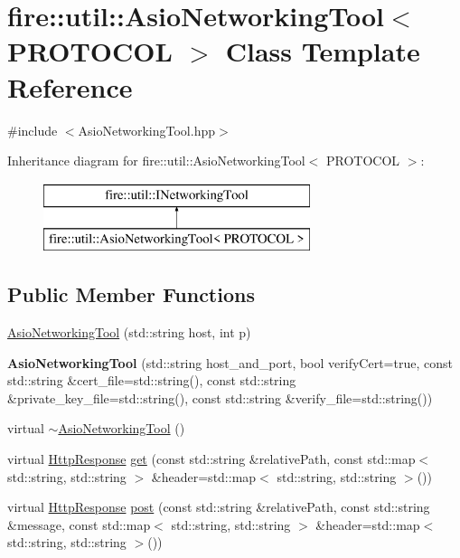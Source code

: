 \hypertarget{a00039}{}\section{fire\+:\+:util\+:\+:Asio\+Networking\+Tool$<$ P\+R\+O\+T\+O\+C\+OL $>$ Class Template Reference}
\label{a00039}


{\ttfamily \#include $<$Asio\+Networking\+Tool.\+hpp$>$}

Inheritance diagram for fire\+:\+:util\+:\+:Asio\+Networking\+Tool$<$ P\+R\+O\+T\+O\+C\+OL $>$\+:\begin{figure}[H]
\begin{center}
\leavevmode
\includegraphics[height=2.000000cm]{a00039}
\end{center}
\end{figure}
\subsection*{Public Member Functions}
\begin{DoxyCompactItemize}
\item 
\hyperlink{a00039_a5edd72ce9937e052a82e7564500b3861}{Asio\+Networking\+Tool} (std\+::string host, int p)
\item 
{\bfseries Asio\+Networking\+Tool} (std\+::string host\+\_\+and\+\_\+port, bool verify\+Cert=true, const std\+::string \&cert\+\_\+file=std\+::string(), const std\+::string \&private\+\_\+key\+\_\+file=std\+::string(), const std\+::string \&verify\+\_\+file=std\+::string())\hypertarget{a00039_a5826de4a9e051ec854ad7be3a48ac86d}{}\label{a00039_a5826de4a9e051ec854ad7be3a48ac86d}

\item 
virtual \hyperlink{a00039_afc51c728e1bd136b6729ac892df490ab}{$\sim$\+Asio\+Networking\+Tool} ()
\item 
virtual \hyperlink{a00140}{Http\+Response} \hyperlink{a00039_a42609f768f245acf0867889e920c5d49}{get} (const std\+::string \&relative\+Path, const std\+::map$<$ std\+::string, std\+::string $>$ \&header=std\+::map$<$ std\+::string, std\+::string $>$())
\item 
virtual \hyperlink{a00140}{Http\+Response} \hyperlink{a00039_a2ac524ceef89fceb928cf74420bf90a5}{post} (const std\+::string \&relative\+Path, const std\+::string \&message, const std\+::map$<$ std\+::string, std\+::string $>$ \&header=std\+::map$<$ std\+::string, std\+::string $>$())
\end{DoxyCompactItemize}
